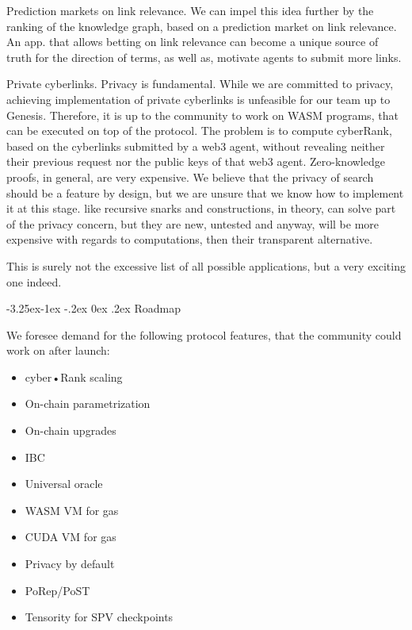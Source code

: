 \documentclass[8pt,oneside]{amsart}
\makeatletter
\newcommand{\linkgreen}[2]{\href{#1}{\color{green}{#2}}}
\renewcommand\subsection{\@startsection{subsection}{2}{\z@}%
                                     {-3.25ex\@plus -1ex \@minus -.2ex}%
                                     {0ex \@plus .2ex}%
                                     {\play\Large}}%
\newcommand{\titleSection}[1]{\subsection{#1}}
\newcommand{\code}[1]{{\PlayBold #1}}
\makeatother
\begin{document}
\begin{Abstract}
\code{Prediction markets on link relevance}. We can impel this idea further by the ranking of the knowledge graph, based on a prediction market on link relevance. An app. that allows betting on link relevance can become a unique source of truth for the direction of terms, as well as, motivate agents to submit more links.

\code{Private cyberlinks}. Privacy is fundamental. While we are committed to privacy, achieving implementation of private cyberlinks is unfeasible for our team up to Genesis. Therefore, it is up to the community to work on WASM programs, that can be executed on top of the protocol. The problem is to compute cyberRank, based on the cyberlinks submitted by a web3 agent, without revealing neither their previous request nor the public keys of that web3 agent. Zero-knowledge proofs, in general, are very expensive. We believe that the privacy of search should be a feature by design, but we are unsure that we know how to implement it at this stage. \linkgreen{https://ipfs.io/ipfs/Qmdje3AmtsfjX9edWAxo3LFhV9CTAXoUvwGR7wHJXnc2Gk}{Coda} like recursive snarks and \linkgreen{https://ipfs.io/ipfs/Qmd99xmraYip9cVv8gRMy6Y97Bkij8qUYArGDME7CzFasg}{mimblewimble} constructions, in theory, can solve part of the privacy concern, but they are new, untested and anyway, will be more expensive with regards to computations, then their transparent alternative.

This is surely not the excessive list of all possible applications, but a very exciting one indeed.

\titleSection{Roadmap}\label{Roadmap}

We foresee demand for the following protocol features, that the community could work on after launch:

\begin{itemize}
\item cyber•Rank scaling
\item On-chain parametrization
\item On-chain upgrades
\item IBC
\item Universal oracle
\item WASM VM for gas
\item CUDA VM for gas
\item Privacy by default
\item PoRep/PoST
\item Tensority for SPV checkpoints

\end{itemize}


\end{Abstract}
\end{document}
